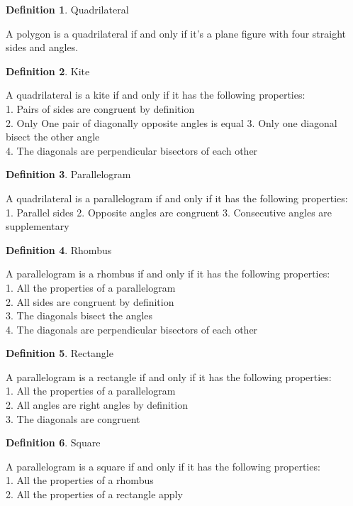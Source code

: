 \documentclass{book}
\theoremstyle{definition}
\newtheorem{definition}{Definition}[section]
\theoremstyle{remark}
\begin{document}
\newpage
\begin{tcolorbox}
\begin{definition}
Quadrilateral 

A polygon is a quadrilateral if and only if it's a plane figure with four straight sides and angles. 
\end{definition}


\begin{definition}
Kite 

A quadrilateral is a kite if and only if it has the following properties: \\
1. Pairs of sides are congruent by definition \\
2. Only One pair of diagonally opposite angles is equal
3. Only one diagonal bisect the other angle \\
4. The diagonals are perpendicular bisectors of each other \\
\end{definition}


\begin{definition}
Parallelogram 

A quadrilateral is a parallelogram if and only if it has the following properties: \\
1. Parallel sides
2. Opposite angles are congruent 
3. Consecutive angles are supplementary
\end{definition}


\begin{definition}
Rhombus 

A parallelogram is a rhombus if and only if it has the following properties: \\
1. All the properties of a parallelogram \\
2. All sides are congruent by definition \\
3. The diagonals bisect the angles \\
4. The diagonals are perpendicular bisectors of each other \\
\end{definition}


\begin{definition}
Rectangle 

A parallelogram is a rectangle if and only if it has the following properties: \\
1. All the properties of a parallelogram \\
2. All angles are right angles by definition \\
3. The diagonals are congruent \\
\end{definition}


\begin{definition}
Square

A parallelogram is a square if and only if it has the following properties: \\
1. All the properties of a rhombus \\
2. All the properties of a rectangle apply \\
\end{definition}
\end{tcolorbox}
\end{document}
